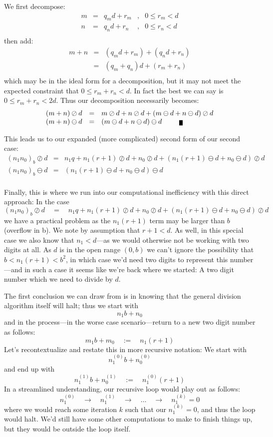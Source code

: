 \documentclass[twoside]{article}
\newenvironment{proof}[1][Proof]{\begin{trivlist}
\item[\hskip \labelsep {\bfseries #1}]}{\end{trivlist}}
\newcommand{\qed}{\nobreak \ifvmode \relax \else
      \ifdim\lastskip<1.5em \hskip-\lastskip
      \hskip1.5em plus0em minus0.5em \fi \nobreak
      \vrule height0.5em width0.5em depth0.25em\fi}
\begin{document}
\begin{proof}
We first decompose:
$$ \begin{array}{rclcl}
m & = & q_md+r_m & , & 0\le r_m < d \\
n & = & q_nd+r_n & , & 0\le r_n < d \\
\end{array} $$
then add:
$$ \begin{array}{rcl}
m+n	& = & (q_md+r_m)+(q_nd+r_n) \\
	& = & (q_m+q_n)d+(r_m+r_n) \\
\end{array} $$
which may be in the ideal form for a decomposition, but it may not meet the expected constraint that $ 0\le r_m+r_n < d $.
In fact the best we can say is $ 0\le r_m+r_n < 2d $. Thus our decomposition necessarily becomes:
$$ \begin{array}{rcl}
(m+n)\oslash d & = & m\oslash d+n\oslash d+(m\ominus d+n\ominus d)\oslash d	\\
(m+n)\ominus d & = & (m\ominus d+n\ominus d)\ominus d\quad\qed
\end{array} $$

\end{proof}
This leads us to our expanded (more complicated) second form of our second case:
$$ \begin{array}{rcl}
(n_1n_0)_b\oslash d	& = & n_1q+n_1(r+1)\oslash d+n_0\oslash d+(n_1(r+1)\ominus d+n_0\ominus d)\oslash d	\\
(n_1n_0)_b\ominus d	& = & (n_1(r+1)\ominus d+n_0\ominus d)\ominus d	\\
\end{array} $$

Finally, this is where we run into our computational inefficiency with this direct approach:  In the case
$$ (n_1n_0)_b\oslash d\quad=\quad n_1q+n_1(r+1)\oslash d+n_0\oslash d+(n_1(r+1)\ominus d+n_0\ominus d)\oslash d $$
we have a practical problem as the $ n_1(r+1) $ term may be larger than $ b $ (overflow in b).
We note by assumption that $ r+1 < d $.  As well, in this special case we also know that $ n_1 < d $---as we would
otherwise not be working with two digits at all. As $ d $ is in the open range $ (0, b) $ we can't ignore the possibility
that $ b < n_1(r+1) < b^2 $, in which case we'd need two digits to represent this number---and in such a case it seems
like we're back where we started: A two digit number which we need to divide by $ d $.

The first conclusion we can draw from is in knowing that the general division algorithm itself will halt; thus we start
with
$$ n_1b+n_0 $$
and in the process---in the worse case scenario---return to a new two digit number as follows:
$$ m_1b+m_0\quad:=\quad n_1(r+1) $$
Let's recontextualize and restate this in more recursive notation: We start with
$$ n_1^{(0)}b+n_0^{(0)} $$
and end up with
$$ n_1^{(1)}b+n_0^{(1)}\quad:=\quad n_1^{(0)}(r+1) $$
In a streamlined understanding, our recursive loop would play out as follows:
$$ n_1^{(0)}\quad\to\quad n_1^{(1)}\quad\to\quad\ldots\quad\to\quad n_1^{(k)}=0 $$
where we would reach some iteration $ k $ such that our $ n_1^{(k)}=0 $, and thus the loop would halt. We'd still have some
other computations to make to finish things up, but they would be outside the loop itself.
\end{document}
